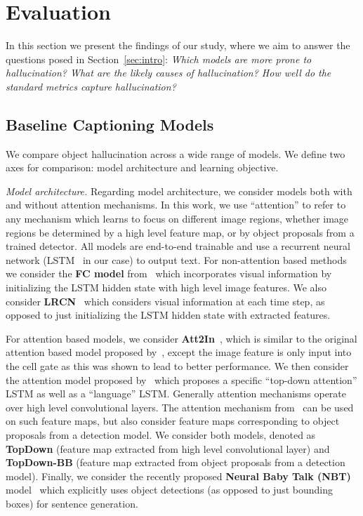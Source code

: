 \section{Evaluation}
%
In this section we present the findings of our study, where we aim to answer the questions posed in Section~\ref{sec:intro}: \emph{Which models are more prone to hallucination? 
%
What are the likely causes of hallucination? How well do the standard metrics capture hallucination?}


%
%
%
%
%
%
%
%
%
%
%
%
%
%
%
%
%

%
%
%
%
%
%
%
%
%
%
%
%
%
%
%
%
%

\subsection{Baseline Captioning Models}
We compare object hallucination across a wide range of models.
We define two axes for comparison: model architecture and learning objective. 

\textit{Model architecture.}
Regarding model architecture, we consider models both with and without attention mechanisms.
In this work, we use ``attention'' to refer to any mechanism which learns to focus on different image regions, whether image regions be determined by a high level feature map, or by object proposals from a trained detector.
All models are end-to-end trainable and use a recurrent neural network (LSTM~\cite{hochreiter1997long} in our case) to output text.
For non-attention based methods we consider the \textbf{FC model} from~\citet{rennie2017cvpr} which incorporates visual information by initializing the LSTM hidden state with high level image features. 
We also consider \textbf{LRCN}~\cite{donahue2015long} which considers visual information at each time step, as opposed to just initializing the LSTM hidden state with extracted features.

For attention based models, we consider  \textbf{Att2In}~\cite{rennie2017cvpr}, which is similar to the original attention based model proposed by~\cite{xu2015show}, except the image feature is only input into the cell gate as this was shown to lead to better performance.
We then consider the attention model proposed by~\cite{anderson2017bottom} which proposes a specific ``top-down attention'' LSTM as well as a ``language'' LSTM.  %
Generally attention mechanisms operate over high level convolutional layers.
The attention mechanism from~\cite{anderson2017bottom} can be used on such feature maps, but \citeauthor{anderson2017bottom} also consider feature maps corresponding to object proposals from a detection model.
We consider both models, denoted as \textbf{TopDown} (feature map extracted from high level convolutional layer) and \textbf{TopDown-BB} (feature map extracted from object proposals from a detection model).
Finally, we consider the recently proposed \textbf{Neural Baby Talk (NBT)} model~\cite{lu2018neural} which explicitly uses object detections (as opposed to just bounding boxes) for sentence generation.%

